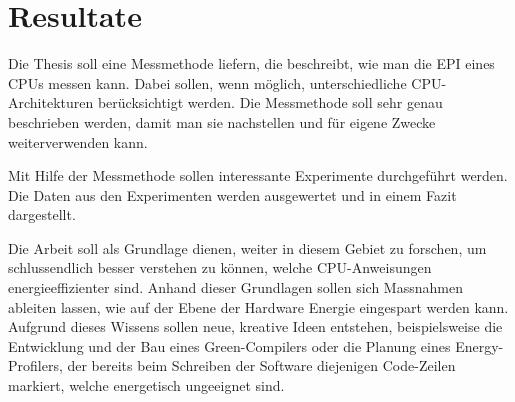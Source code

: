 \section{Resultate}

Die Thesis soll eine Messmethode liefern, die beschreibt, wie man die EPI eines CPUs messen kann. Dabei sollen, wenn möglich,
unterschiedliche CPU-Architekturen berücksichtigt werden. Die Messmethode soll sehr genau beschrieben werden, damit man sie
nachstellen und für eigene Zwecke weiterverwenden kann.
\par
Mit Hilfe der Messmethode sollen interessante Experimente durchgeführt werden. Die Daten aus den Experimenten werden ausgewertet
und in einem Fazit dargestellt.
\par
Die Arbeit soll als Grundlage dienen, weiter in diesem Gebiet zu forschen, um schlussendlich besser verstehen zu können,
welche CPU-Anweisungen energieeffizienter sind.
Anhand dieser Grundlagen sollen sich Massnahmen ableiten lassen, wie auf der Ebene der Hardware Energie eingespart werden kann.
Aufgrund dieses Wissens sollen neue, kreative Ideen entstehen, beispielsweise die Entwicklung und der Bau eines Green-Compilers
oder die Planung eines Energy-Profilers, der bereits beim Schreiben der Software diejenigen Code-Zeilen markiert, welche energetisch
ungeeignet sind.



